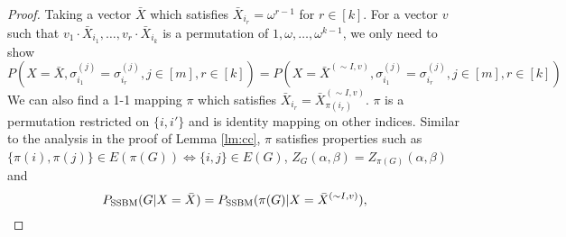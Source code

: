 \documentclass{article}
\begin{document}
\begin{proof}
Taking a vector $\bar{X}$ which satisfies $\bar{X}_{i_r} = \omega^{r-1}$ for $r\in [k]$. For a vector $v$ such that $v_{1}\cdot \bar{X}_{i_1}, \dots, v_{r} \cdot \bar{X}_{i_k}$ is a permutation of $1, \omega, \dots, \omega^{k-1}$, we only need to show
\begin{equation}\label{eq:11}
P(X=\bar{X}, \sigma_{i_1}^{(j)}=\sigma_{i_r}^{(j)}, j\in[m], r\in[k]) = P(X=\bar{X}^{(\sim I, v)}, \sigma_{i_1}^{(j)}=\sigma_{i_r}^{(j)}, j\in[m], r\in[k])
\end{equation}
We can also find a 1-1 mapping $\pi$ which satisfies $ \bar{X}_{i_r} = \bar{X}^{(\sim I, v)}_{\pi(i_r)}$. $\pi$ is a permutation restricted on $\{i,i'\}$ and is identity mapping on other indices.
Similar to the analysis in the proof of Lemma \ref{lm:cc}, $\pi$ satisfies properties such as
$\{\pi(i), \pi(j)\} \in E(\pi(G)) \iff \{i,j\} \in E(G)$, $Z_G(\alpha, \beta) = Z_{\pi(G)}(\alpha, \beta)$ and
$$
P_{\operatorname{SSBM}}(G  | X = \bar{X})=P_{\operatorname{SSBM}}(\pi(G) | X = \bar{X}^{(\sim I,v)}),
$$


\end{proof}
\end{document}
